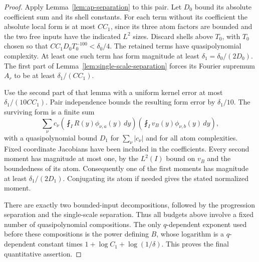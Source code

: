 \begin{proof}
Apply Lemma~\ref{lem:ap-separation} to this pair.
Let \(D_0\) bound its absolute coefficient sum and its shell
constants.  For each term without its coefficient the absolute
local form is at most \(C C_1\), since its three atom factors are
bounded and the two free inputs have the indicated \(L^2\) sizes.
Discard shells above \(T_0\), with \(T_0\) chosen so that
\(C C_1D_0T_0^{-100}<\delta_0/4\).
The retained terms have quasipolynomial complexity.
At least one such term has form magnitude at least
\(\delta_1=\delta_0/(2D_0)\).
The first part of Lemma~\ref{lem:single-scale-separation} forces its
Fourier supremum \(A_r\) to be at least
\(\delta_1/(C C_1)\).

Use the second part of that lemma with a uniform kernel error at most
\(\delta_1/(10C C_1)\).
Pair independence bounds the resulting form error by
\(\delta_1/10\).  The surviving form is a finite sum
\[
 \sum_\nu c_\nu
    \left(\fint_I R(y)\phi_{\nu,a}(y)\,dy\right)
    \left(\fint_I v_B(y)\phi_{\nu,b}(y)\,dy\right),
\]
with a quasipolynomial bound \(D_1\) for
\(\sum_\nu|c_\nu|\) and for all atom complexities.
Fixed coordinate Jacobians have been included in the coefficients.
Every second moment has magnitude at most one, by the \(L^2(I)\)
bound on \(v_B\) and the boundedness of its atom.
Consequently one of the first moments has magnitude at least
\(\delta_1/(2D_1)\).
Conjugating its atom if needed gives the stated normalized moment.

There are exactly two bounded-input decompositions, followed by the
progression separation and the single-scale separation.
Thus all budgets above involve a fixed number of quasipolynomial
compositions.  The only \(q\)-dependent exponent used before these
compositions is the power defining \(B\), whose logarithm is a
\(q\)-dependent constant times
\(1+\log C_1+\log(1/\delta)\).
This proves the final quantitative assertion.
\end{proof}
